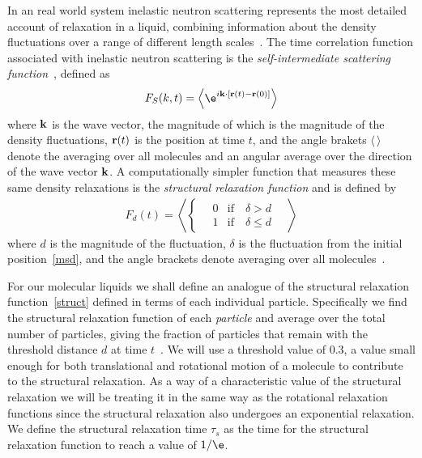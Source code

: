 In an real world system inelastic neutron scattering represents the most detailed account of relaxation in a liquid, combining information about the density fluctuations over a range of different length scales~\cite{perera:99}. The time correlation function associated with inelastic neutron scattering is the \emph{self-intermediate scattering function}~\tocite, defined as
\begin{equation}
    F_{S}(k,t) = \left \langle\e^{i\vect{k} \cdot [\vect r(t)-\vect r(0)]}\right \rangle
\end{equation}
where $\mathbf{k}$ is the wave vector, the magnitude of which is the magnitude of the density fluctuations, $\mathbf{r}(t)$ is the position at time $t$, and the angle brakets $\langle\,\rangle$ denote the averaging over all molecules and an angular average over the direction of the wave vector $\mathbf{k}$. A computationally simpler function that measures these same density relaxations is the \emph{structural relaxation function} and is defined by
\begin{align}
    F_d(t) = \left \langle \begin{cases}
        \quad0 &\text{if}\quad \delta > d \\
        \quad1 &\text{if}\quad \delta \leq d
    \end{cases} \quad \right \rangle
    \label{eq:struct}
\end{align}
where $d$ is the magnitude of the fluctuation, $\delta$ is the fluctuation from the initial position~\eqref{msd}, and the angle brackets denote averaging over all molecules~\cite{widmer:12}.

For our molecular liquids we shall define an analogue of the structural relaxation function~\eqref{struct} defined in terms of each individual particle. Specifically we find the structural relaxation function of each \emph{particle} and average over the total number of particles, giving the fraction of particles that remain with the threshold distance $d$ at time $t$~. We will use a threshold value of \num{0.3}, a value small enough for both translational and rotational motion of a molecule to contribute to the structural relaxation. As a way of a characteristic value of the structural relaxation we will be treating it in the same way as the rotational relaxation functions since the structural relaxation also undergoes an exponential relaxation. We define the structural relaxation time $\tau_s$ as the time for the structural relaxation function to reach a value of $1/\e$.

